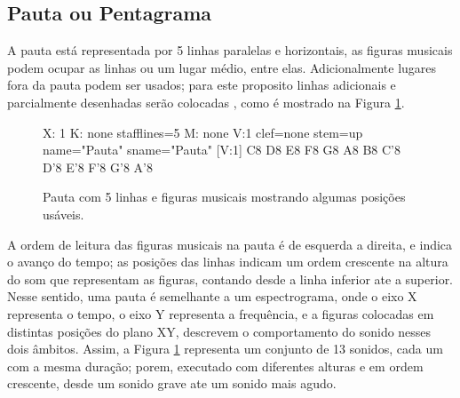 \subsection{Pauta ou Pentagrama}
\label{sec:pauta}
A pauta está representada por 5 linhas paralelas e horizontais, 
as figuras musicais podem ocupar as linhas ou um lugar médio, entre elas.
Adicionalmente lugares fora da pauta podem ser usados; 
para este proposito linhas adicionais e parcialmente desenhadas serão colocadas \cite[pp. 10]{cardoso1973curso},
como é mostrado na Figura \ref{fig:abc-pauta5}.
\begin{figure}[H]
\centering
\begin{abc}[name=abc-pauta5]
%
X: 1 %
K: none stafflines=5 %
M: none %
V:1 clef=none stem=up name="Pauta"   sname="Pauta"
%
[V:1] C8 D8 E8 F8 G8 A8 B8 C'8 D'8 E'8 F'8 G'8 A'8
\end{abc}
\caption{Pauta com 5 linhas e figuras musicais mostrando algumas posições usáveis.}
\label{fig:abc-pauta5}
\end{figure}
A ordem de leitura das figuras musicais na pauta é de esquerda a direita,
e indica o avanço  do tempo;
as posições das linhas indicam um ordem crescente na altura do som que representam as figuras,
contando desde a linha inferior ate a superior. Nesse sentido, 
uma pauta é semelhante a um espectrograma, onde o eixo X representa o tempo,
o eixo Y representa a frequência, e a figuras colocadas em distintas posições do plano XY, descrevem
o comportamento do sonido nesses dois âmbitos. Assim, a Figura \ref{fig:abc-pauta5}
representa um conjunto de 13 sonidos, cada um com a mesma duração; 
porem, executado com diferentes alturas e em ordem crescente, 
desde um sonido grave ate um sonido mais agudo.


